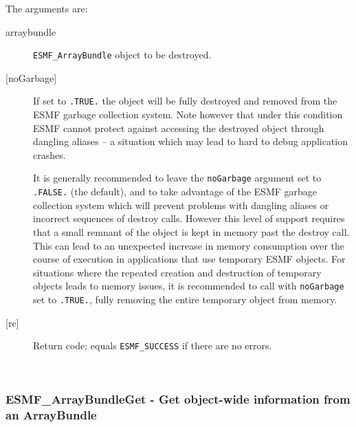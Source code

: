    The arguments are:
   \begin{description}
   \item[arraybundle]
        {\tt ESMF\_ArrayBundle} object to be destroyed.
   \item[{[noGarbage]}]
        If set to {\tt .TRUE.} the object will be fully destroyed and removed
        from the ESMF garbage collection system. Note however that under this 
        condition ESMF cannot protect against accessing the destroyed object 
        through dangling aliases -- a situation which may lead to hard to debug 
        application crashes.
   
        It is generally recommended to leave the {\tt noGarbage} argument
        set to {\tt .FALSE.} (the default), and to take advantage of the ESMF 
        garbage collection system which will prevent problems with dangling
        aliases or incorrect sequences of destroy calls. However this level of
        support requires that a small remnant of the object is kept in memory
        past the destroy call. This can lead to an unexpected increase in memory
        consumption over the course of execution in applications that use 
        temporary ESMF objects. For situations where the repeated creation and 
        destruction of temporary objects leads to memory issues, it is 
        recommended to call with {\tt noGarbage} set to {\tt .TRUE.}, fully 
        removing the entire temporary object from memory.
   \item[{[rc]}]
        Return code; equals {\tt ESMF\_SUCCESS} if there are no errors.
   \end{description}
   
 
\mbox{}\hrulefill\ 
 
\subsubsection [ESMF\_ArrayBundleGet] {ESMF\_ArrayBundleGet - Get object-wide information from an ArrayBundle}


